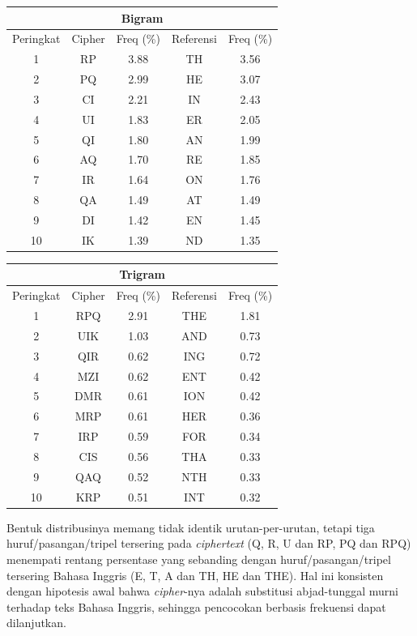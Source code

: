 \begin{enumerate}
  \begin{center}
    \small
    \begin{tabular}{|c|c|c||c|c|}
      \hline
      \multicolumn{5}{|c|}{Bigram} \\
      \hline
      Peringkat & Cipher & Freq (\%) & Referensi & Freq (\%) \\
      \hline
      1 & RP & 3.88 & TH & 3.56 \\
      2 & PQ & 2.99 & HE & 3.07 \\
      3 & CI & 2.21 & IN & 2.43 \\
      4 & UI & 1.83 & ER & 2.05 \\
      5 & QI & 1.80 & AN & 1.99 \\
      6 & AQ & 1.70 & RE & 1.85 \\
      7 & IR & 1.64 & ON & 1.76 \\
      8 & QA & 1.49 & AT & 1.49 \\
      9 & DI & 1.42 & EN & 1.45 \\
      10 & IK & 1.39 & ND & 1.35 \\
      \hline
    \end{tabular}
  \end{center}

  \begin{center}
    \small
    \begin{tabular}{|c|c|c||c|c|}
      \hline
      \multicolumn{5}{|c|}{Trigram} \\
      \hline
      Peringkat & Cipher & Freq (\%) & Referensi & Freq (\%) \\
      \hline
      1 & RPQ & 2.91 & THE & 1.81 \\
      2 & UIK & 1.03 & AND & 0.73 \\
      3 & QIR & 0.62 & ING & 0.72 \\
      4 & MZI & 0.62 & ENT & 0.42 \\
      5 & DMR & 0.61 & ION & 0.42 \\
      6 & MRP & 0.61 & HER & 0.36 \\
      7 & IRP & 0.59 & FOR & 0.34 \\
      8 & CIS & 0.56 & THA & 0.33 \\
      9 & QAQ & 0.52 & NTH & 0.33 \\
      10 & KRP & 0.51 & INT & 0.32 \\
      \hline
    \end{tabular}
  \end{center}

  Bentuk distribusinya memang tidak identik urutan-per-urutan, tetapi tiga huruf/pasangan/tripel tersering pada
  \textit{ciphertext} (Q, R, U dan RP, PQ dan RPQ) menempati rentang
  persentase yang sebanding dengan huruf/pasangan/tripel tersering Bahasa
  Inggris (E, T, A dan TH, HE dan THE). Hal ini konsisten dengan hipotesis awal
  bahwa \textit{cipher}-nya adalah substitusi abjad-tunggal murni terhadap
  teks Bahasa Inggris, sehingga pencocokan berbasis frekuensi dapat
  dilanjutkan.


\end{enumerate}
